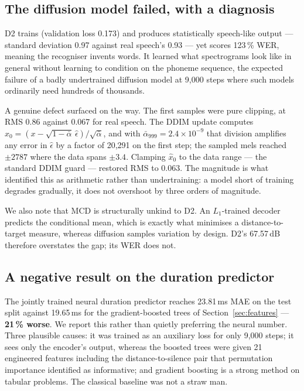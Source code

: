 \documentclass[conference]{IEEEtran}
\begin{document}
\subsection{The diffusion model failed, with a diagnosis}
D2 trains (validation loss 0.173) and produces statistically speech-like output --- standard
deviation 0.97 against real speech's 0.93 --- yet scores 123\,\% WER, meaning the recogniser
invents words. It learned what spectrograms look like in general without learning to condition on
the phoneme sequence, the expected failure of a badly undertrained diffusion model at 9{,}000
steps where such models ordinarily need hundreds of thousands.

A genuine defect surfaced on the way. The first samples were pure clipping, at RMS 0.86 against
0.067 for real speech. The DDIM update computes
$\hat{x}_0 = (x - \sqrt{1-\bar\alpha}\,\hat\epsilon)/\sqrt{\bar\alpha}$, and with
$\bar\alpha_{999} = 2.4\times10^{-9}$ that division amplifies any error in $\hat\epsilon$ by
a factor of 20{,}291 on the first step; the sampled mels reached $\pm2787$ where the data spans
$\pm3.4$. Clamping $\hat{x}_0$ to the data range --- the standard DDIM guard --- restored RMS to
0.063. The magnitude is what identified this as arithmetic rather than undertraining: a model
short of training degrades gradually, it does not overshoot by three orders of magnitude.

We also note that MCD is structurally unkind to D2. An $L_1$-trained decoder predicts the
conditional mean, which is exactly what minimises a distance-to-target measure, whereas diffusion
samples variation by design. D2's 67.57\,dB therefore overstates the gap; its WER does not.

\subsection{A negative result on the duration predictor}
The jointly trained neural duration predictor reaches 23.81\,ms MAE on the test split against
19.65\,ms for the gradient-boosted trees of Section~\ref{sec:features} --- \textbf{21\,\% worse}.
We report this rather than quietly preferring the neural number. Three plausible causes: it was
trained as an auxiliary loss for only 9{,}000 steps; it sees only the encoder's output, whereas
the boosted trees were given 21 engineered features including the distance-to-silence pair that
permutation importance identified as informative; and gradient boosting is a strong method on
tabular problems. The classical baseline was not a straw man.
\end{document}
